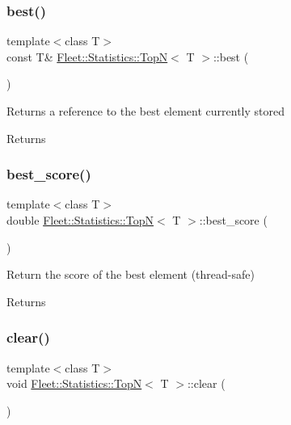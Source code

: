 \subsubsection{\texorpdfstring{best()}{best()}}
{\footnotesize\ttfamily template$<$class T$>$ \\
const T\& \hyperlink{class_fleet_1_1_statistics_1_1_top_n}{Fleet\+::\+Statistics\+::\+TopN}$<$ T $>$\+::best (\begin{DoxyParamCaption}{ }\end{DoxyParamCaption})\hspace{0.3cm}{\ttfamily [inline]}}

Returns a reference to the best element currently stored \begin{DoxyReturn}{Returns}

\end{DoxyReturn}
\mbox{\label{class_fleet_1_1_statistics_1_1_top_n_a2881453d64d161d43d55eacdfc97627c}} 
\subsubsection{\texorpdfstring{best\+\_\+score()}{best\_score()}}
{\footnotesize\ttfamily template$<$class T$>$ \\
double \hyperlink{class_fleet_1_1_statistics_1_1_top_n}{Fleet\+::\+Statistics\+::\+TopN}$<$ T $>$\+::best\+\_\+score (\begin{DoxyParamCaption}{ }\end{DoxyParamCaption})\hspace{0.3cm}{\ttfamily [inline]}}

Return the score of the best element (thread-\/safe) \begin{DoxyReturn}{Returns}

\end{DoxyReturn}
\mbox{\label{class_fleet_1_1_statistics_1_1_top_n_ab57188b1858802dcf1f26dbcf702c6ae}} 
\subsubsection{\texorpdfstring{clear()}{clear()}}
{\footnotesize\ttfamily template$<$class T$>$ \\
void \hyperlink{class_fleet_1_1_statistics_1_1_top_n}{Fleet\+::\+Statistics\+::\+TopN}$<$ T $>$\+::clear (\begin{DoxyParamCaption}{ }\end{DoxyParamCaption})\hspace{0.3cm}{\ttfamily [inline]}}

